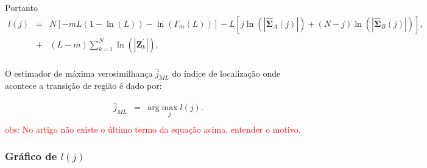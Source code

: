 \documentclass[12pt,a4paper]{article}
\begin{document}
Portanto 
\begin{equation}\label{eqn124}
\begin{array}{rcl}
	l(j)&=&N\left[-mL(1-\ln{\left(L\right)})-\ln{\left(\Gamma_m(L)\right)}\right]-L\left[j\ln{\left(|\mathbf{\widehat{\Sigma}}_{A}(j)|\right)} +(N-j)\ln{\left(|\mathbf{\widehat{\Sigma}}_{B}(j)|\right)}\right], \\
	&+&(L-m)\sum_{k=1}^{N}\ln{\left(|\mathbf{Z}_{k}^{'}|\right)}, \\
\end{array}
\end{equation}

O estimador de máxima verosimilhança $\widehat{j}_{ML}$ do índice de localização onde acontece a transição de região é dado por:


\begin{equation}\label{eqn125}
\begin{array}{rcl}
	\widehat{j}_{ML}&=&\text{arg}\max\limits_{j}l(j).  \\
\end{array}
\end{equation}
\textcolor{red}{obs: No artigo não existe o último termo da equação acima, entender o motivo. }
\subsubsection{Gráfico de $l(j)$}



 
\end{document}
